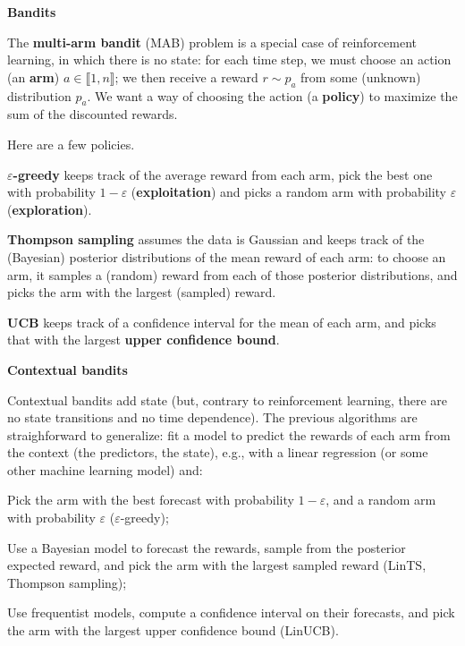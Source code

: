 \documentclass[a5paper]{article}
\let\epsilon\varepsilon
\let\d\textbf
\def\subsection#1{{\par\bigskip\goodbreak\large\bfseries #1\par}}
\begin{document}
\subsection{Bandits}

The \d{multi-arm bandit} (MAB) problem is a special case of reinforcement learning, in which there is no state:
for each time step,
we must choose an action (an \d{arm}) $a \in \llbracket 1, n \rrbracket$;
we then receive a reward $r \sim p_a$ from some (unknown) distribution $p_a$.
We want a way of choosing the action (a \d{policy})
to maximize the sum of the discounted rewards.

Here are a few policies.

\d{$\epsilon$-greedy} keeps track of the average reward from each arm, pick the best one with probability $1-\epsilon$ (\d{exploitation})
and picks a random arm with probability $\epsilon$ (\d{exploration}).

\d{Thompson sampling} assumes the data is Gaussian and keeps track of the (Bayesian) posterior distributions
of the mean reward of each arm:
to choose an arm, it samples a (random) reward from each of those posterior distributions,
and picks the arm with the largest (sampled) reward.

\d{UCB} keeps track of a confidence interval for the mean of each arm, and picks that with the largest \d{upper confidence bound}.

\subsection{Contextual bandits}

Contextual bandits add state
(but, contrary to reinforcement learning, there are no state transitions and no time dependence).
The previous algorithms are straighforward to generalize: fit a model to predict the rewards of each arm
from the context (the predictors, the state),
e.g., with a linear regression (or some other machine learning model) and:
\begin{compactitem}[--]
\item Pick the arm with the best forecast with probability $1-\epsilon$, and a random arm with probability $\epsilon$ ($\epsilon$-greedy);
\item Use a Bayesian model to forecast the rewards,
sample from the posterior expected reward, and pick the arm with the largest sampled reward (LinTS, Thompson sampling);
\item Use frequentist models, compute a confidence interval on their forecasts, and pick the arm with the largest upper confidence bound (LinUCB).
\end{compactitem}
\end{document}
